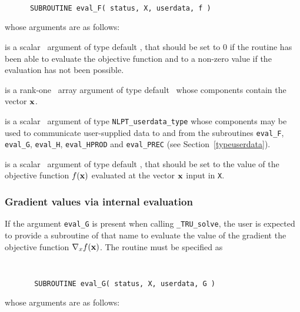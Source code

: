 \documentclass{galahad}
\newcommand{\packagename}{TRU}
\newcommand{\fullpackagename}{\libraryname\_\packagename}
\newcommand{\solver}{{\tt \fullpackagename\_solve}}
\begin{document}
\def\baselinestretch{0.8}
{\tt
\begin{verbatim}
      SUBROUTINE eval_F( status, X, userdata, f )
\end{verbatim}
}
\def\baselinestretch{1.0}
\noindent whose arguments are as follows:

\begin{description}
 is a scalar \intentout\ argument of type default \integer,
that should be set to 0 if the routine has been able to evaluate
the objective function
and to a non-zero value if the evaluation has not been possible.

 is a rank-one \intentin\ array argument of type default \realdp\
whose components contain the vector ${\mathbf{x}}$.

 is a scalar \intentinout\ argument of type
{\tt NLPT\_userdata\_type} whose components may be used
to communicate user-supplied data to and from the
subroutines {\tt eval\_F}, {\tt eval\_G},
{\tt eval\_H}, {\tt eval\_HPROD} and {\tt eval\_PREC}
(see Section~\ref{typeuserdata}).

 is a scalar \intentout\ argument of type default \realdp,
that should be set to the value of the objective function $f({\mathbf{x}})$
evaluated at the vector ${\mathbf{x}}$ input in {\tt X}.

\end{description}


\subsubsection{Gradient values via internal evaluation\label{gfv}}

If the argument {\tt eval\_G} is present when calling \solver, the
user is expected to provide a subroutine of that name to evaluate the
value of the gradient the objective function $\nabla_x f({\mathbf{x}})$.
The routine must be specified as

\def\baselinestretch{0.8}
{\tt
\begin{verbatim}
       SUBROUTINE eval_G( status, X, userdata, G )
\end{verbatim} }
\def\baselinestretch{1.0}
\noindent whose arguments are as follows:
\end{document}
